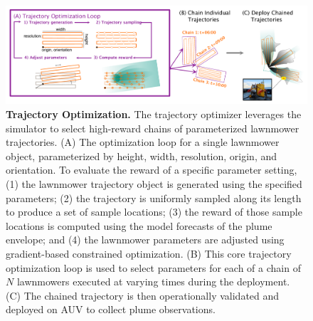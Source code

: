 \begin{figure}[h!]
    \centering
    \includegraphics[width=1\columnwidth]{figures/trajectory_optimization.pdf}
    \caption[Trajectory optimization.]{\textbf{Trajectory Optimization.} The trajectory optimizer leverages the \PHUMES simulator to select high-reward chains of parameterized lawnmower trajectories. (A) The optimization loop for a single lawnmower object, parameterized by height, width, resolution, origin, and orientation. To evaluate the reward of a specific parameter setting, (1) the lawnmower trajectory object is generated using the specified parameters; (2) the trajectory is uniformly sampled along its length to produce a set of sample locations; (3) the reward of those sample locations is computed using the \PHUMES model forecasts of the plume envelope; and (4) the lawnmower parameters are adjusted using gradient-based constrained optimization. (B) This core trajectory optimization loop is used to select parameters for each of a chain of $N$ lawnmowers executed at varying times during the deployment. (C) The chained trajectory is then operationally validated and deployed on AUV \Sentry to collect plume observations.}
    \label{fig:traj_opt}
\end{figure}

